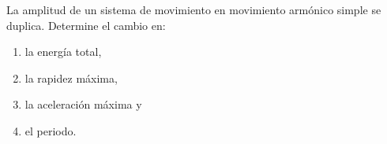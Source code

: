 \item La amplitud de un sistema de movimiento en movimiento armónico simple se duplica. Determine el cambio en:
\begin{enumerate}
    \item la energía total,
    \item la rapidez máxima,
    \item la aceleración máxima y
    \item el periodo.
\end{enumerate}